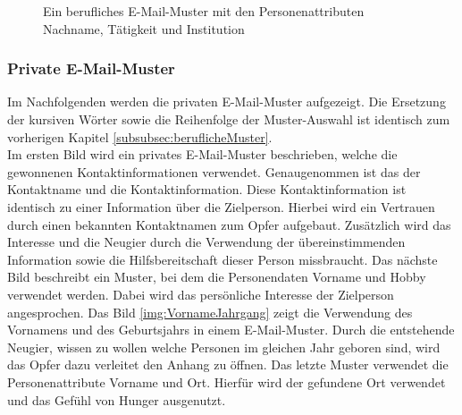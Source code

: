 			\begin{figure}[h!]
				\caption{Ein berufliches E-Mail-Muster mit den Personenattributen Nachname, Tätigkeit und Institution }
				\label{img:NachnameTätigkeitInsitution}
			\end{figure}
			\FloatBarrier
		\subsubsection{Private E-Mail-Muster}
			Im Nachfolgenden werden die privaten E-Mail-Muster aufgezeigt. Die Ersetzung der kursiven Wörter sowie die Reihenfolge der Muster-Auswahl ist identisch zum vorherigen Kapitel \ref{subsubsec:beruflicheMuster}.\\
			Im ersten Bild wird ein privates E-Mail-Muster beschrieben, welche die gewonnenen Kontaktinformationen verwendet. Genaugenommen ist das der Kontaktname und die Kontaktinformation. Diese Kontaktinformation ist identisch zu einer Information über die Zielperson. Hierbei wird ein Vertrauen durch einen bekannten Kontaktnamen zum Opfer aufgebaut. Zusätzlich wird das Interesse und die Neugier durch die Verwendung der übereinstimmenden Information sowie die Hilfsbereitschaft dieser Person missbraucht. Das nächste Bild beschreibt ein Muster, bei dem die Personendaten Vorname und Hobby verwendet werden. Dabei wird das persönliche Interesse der Zielperson angesprochen. Das Bild \ref{img:VornameJahrgang} zeigt die Verwendung des Vornamens und des Geburtsjahrs in einem E-Mail-Muster. Durch die entstehende Neugier, wissen zu wollen welche Personen im gleichen Jahr geboren sind, wird das Opfer dazu verleitet den Anhang zu öffnen. Das letzte Muster verwendet die Personenattribute Vorname und Ort. Hierfür wird der gefundene Ort verwendet und das Gefühl von Hunger ausgenutzt.\\
			\FloatBarrier
			
